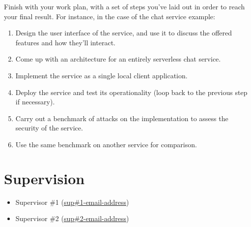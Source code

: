 \documentclass{article}
\begin{document}
Finish with your work plan, with a set of steps you've laid out in order to reach your final result.
For instance, in the case of the chat service example:
\begin{enumerate}
    \item Design the user interface of the service, and use it to discuss the offered features and how they'll interact.
    \item Come up with an architecture for an entirely serverless chat service.
    \item Implement the service as a single local client application.
    \item Deploy the service and test its operationality (loop back to the previous step if necessary).
    \item Carry out a benchmark of attacks on the implementation to assess the security of the service.
    \item Use the same benchmark on another service for comparison.
\end{enumerate}

\section*{Supervision}

\begin{itemize}
\renewcommand\labelitemi{--}
    \item Supervisor \#1 (\href{mailto:supervisor1@nyu.edu}{sup\#1-email-address})
    \item Supervisor \#2 (\href{mailto:supervisor2@nyu.edu}{sup\#2-email-address})
\end{itemize}




\end{document}
